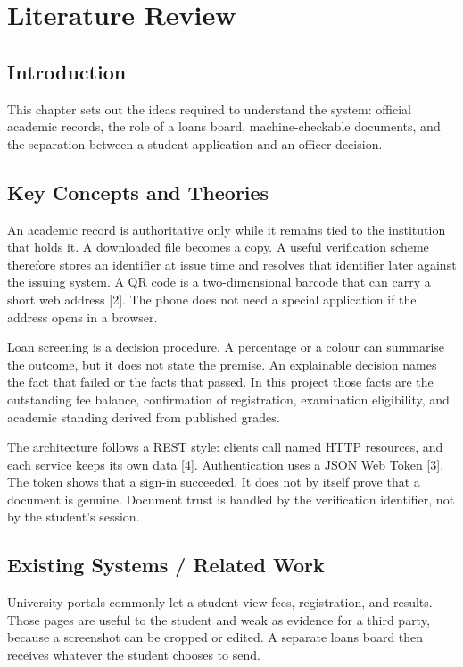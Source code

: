 \documentclass[12pt,a4paper]{report}
\begin{document}
\chapter{Literature Review}

\section{Introduction}
This chapter sets out the ideas required to understand the system: official academic records, the role of a loans board, machine-checkable documents, and the separation between a student application and an officer decision.

\section{Key Concepts and Theories}
An academic record is authoritative only while it remains tied to the institution that holds it. A downloaded file becomes a copy. A useful verification scheme therefore stores an identifier at issue time and resolves that identifier later against the issuing system. A QR code is a two-dimensional barcode that can carry a short web address [2]. The phone does not need a special application if the address opens in a browser.

Loan screening is a decision procedure. A percentage or a colour can summarise the outcome, but it does not state the premise. An explainable decision names the fact that failed or the facts that passed. In this project those facts are the outstanding fee balance, confirmation of registration, examination eligibility, and academic standing derived from published grades.

The architecture follows a REST style: clients call named HTTP resources, and each service keeps its own data [4]. Authentication uses a JSON Web Token [3]. The token shows that a sign-in succeeded. It does not by itself prove that a document is genuine. Document trust is handled by the verification identifier, not by the student's session.

\section{Existing Systems / Related Work}
University portals commonly let a student view fees, registration, and results. Those pages are useful to the student and weak as evidence for a third party, because a screenshot can be cropped or edited. A separate loans board then receives whatever the student chooses to send.
\end{document}

